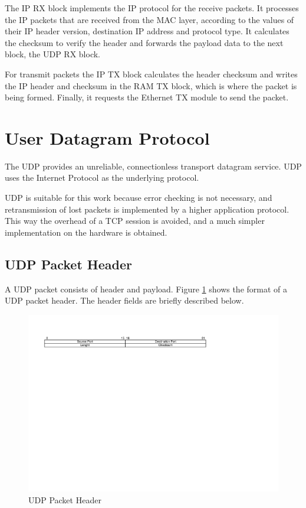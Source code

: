 \documentclass[defaultstyle,10pt,master,Helvetica]{thesis}
\begin{document}
The \ac{IP} RX block implements the \ac{IP} protocol for the receive packets. It processes the \ac{IP} packets that are received from the \ac{MAC} layer, according to the values of their \ac{IP} header version, destination \ac{IP} address and protocol type. It calculates the checksum to verify the header and forwards the payload data to the next block, the \ac{UDP} RX block.

For transmit packets the \ac{IP} TX block calculates the header checksum and writes the \ac{IP} header and checksum in the \acs{RAM} TX block, which is where the packet is being formed. Finally, it requests the Ethernet TX module to send the packet.


\section{User Datagram Protocol}

The \acf{UDP}\cite{rfc768} provides an unreliable, connectionless transport datagram service. \ac{UDP} uses the Internet Protocol as the underlying protocol.

\ac{UDP} is suitable for this work because error checking is not necessary, and retransmission of lost packets is implemented by a higher application protocol. This way the overhead of a TCP session is avoided, and a much simpler implementation on the hardware is obtained. 



\subsection{\ac{UDP} Packet Header}

A UDP packet consists of header and payload. Figure \ref{fig:udp} shows the format of a \ac{UDP} packet header. The header fields are briefly described below.

\begin{figure}[h]
  \centering
      \includegraphics[scale=0.8,center]{Diagrams/UDP-Header.pdf}
  \caption{\ac{UDP} Packet Header}\label{fig:udp}
\end{figure}
\end{document}
